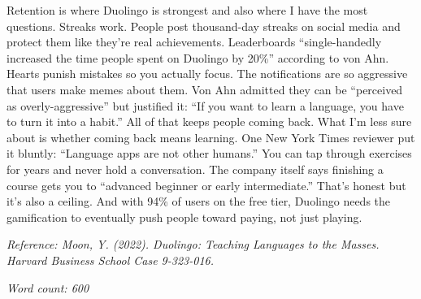 \documentclass[12pt]{article}
\begin{document}
Retention is where Duolingo is strongest and also where I have the most questions. Streaks work. People post thousand-day streaks on social media and protect them like they're real achievements. Leaderboards ``single-handedly increased the time people spent on Duolingo by 20\%'' according to von Ahn. Hearts punish mistakes so you actually focus. The notifications are so aggressive that users make memes about them. Von Ahn admitted they can be ``perceived as overly-aggressive'' but justified it: ``If you want to learn a language, you have to turn it into a habit.'' All of that keeps people coming back. What I'm less sure about is whether coming back means learning. One New York Times reviewer put it bluntly: ``Language apps are not other humans.'' You can tap through exercises for years and never hold a conversation. The company itself says finishing a course gets you to ``advanced beginner or early intermediate.'' That's honest but it's also a ceiling. And with 94\% of users on the free tier, Duolingo needs the gamification to eventually push people toward paying, not just playing.

\vfill
\noindent\small\textit{Reference: Moon, Y. (2022). Duolingo: Teaching Languages to the Masses. Harvard Business School Case 9-323-016.}

\vspace{1em}
\noindent\footnotesize\textit{Word count: 600}
\end{document}
